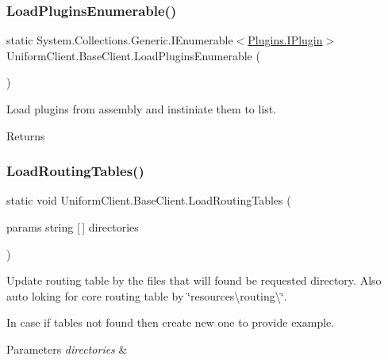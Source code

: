 \subsubsection{\texorpdfstring{Load\+Plugins\+Enumerable()}{LoadPluginsEnumerable()}}
{\footnotesize\ttfamily static System.\+Collections.\+Generic.\+I\+Enumerable$<$\mbox{\hyperlink{interface_uniform_client_1_1_plugins_1_1_i_plugin}{Plugins.\+I\+Plugin}}$>$ Uniform\+Client.\+Base\+Client.\+Load\+Plugins\+Enumerable (\begin{DoxyParamCaption}{ }\end{DoxyParamCaption})\hspace{0.3cm}{\ttfamily [static]}}



Load plugins from assembly and instiniate them to list. 

\begin{DoxyReturn}{Returns}

\end{DoxyReturn}
\mbox{\label{class_uniform_client_1_1_base_client_a5f8f22aa4ab8219fb5f1b6a358f68daf}} 
\subsubsection{\texorpdfstring{Load\+Routing\+Tables()}{LoadRoutingTables()}}
{\footnotesize\ttfamily static void Uniform\+Client.\+Base\+Client.\+Load\+Routing\+Tables (\begin{DoxyParamCaption}\item[{params string \mbox{[}$\,$\mbox{]}}]{directories }\end{DoxyParamCaption})\hspace{0.3cm}{\ttfamily [static]}}



Update routing table by the files that will found be requested directory. Also auto loking for core routing table by \char`\"{}resources\textbackslash{}routing\textbackslash{}\char`\"{}. 

In case if tables not found then create new one to provide example. 


\begin{DoxyParams}{Parameters}
{\em directories} & \\
\hline
\end{DoxyParams}
\mbox{\label{class_uniform_client_1_1_base_client_a56ba8d0360e3c65a69d2d69db878ec23}} 
